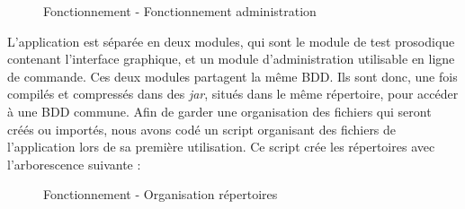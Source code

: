 \begin{figure}[!ht]
\begin{center}
  \caption{Fonctionnement - Fonctionnement administration}
  \label{seqenceAdmin} 
\end{center}
\end{figure}

\newpage
L'application est séparée en deux modules, qui sont le module de test prosodique contenant l'interface graphique, et un module d'administration utilisable en ligne de commande. Ces deux modules partagent la même BDD. Ils sont donc, une fois compilés et compressés dans des \textit{jar}, situés dans le même répertoire, pour accéder à une BDD commune. Afin de garder une organisation des fichiers qui seront créés ou importés, nous avons codé un script organisant des fichiers de l'application lors de sa première utilisation. Ce script crée les répertoires avec l'arborescence suivante :

\begin{figure}[!ht]
\begin{center}
  \caption{Fonctionnement - Organisation répertoires}
  \label{tree} 
\end{center}
\end{figure}

